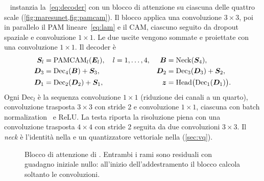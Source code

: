 \maresunet{}~\cite{li2022maresunet} instanzia la~\eqref{eq:decoder} con un blocco di attenzione
su ciascuna delle quattro scale (\cref{fig:maresunet,fig:pamcam}). Il blocco applica una
convoluzione $3\times3$, poi in parallelo il PAM lineare~\eqref{eq:lam} e il CAM, ciascuno
seguito da dropout spaziale e convoluzione $1\times1$. Le due uscite vengono sommate e
proiettate con una convoluzione $1\times1$. Il decoder è
\begin{align}
  \bm{S}_l &= \mathrm{PAMCAM}_l(\bm{E}_l),\quad l=1,\dots,4, &
  \bm{B} &= \mathrm{Neck}(\bm{S}_4), \nonumber\\
  \bm{D}_3 &= \mathrm{Dec}_4(\bm{B})+\bm{S}_3, &
  \bm{D}_2 &= \mathrm{Dec}_3(\bm{D}_3)+\bm{S}_2, \label{eq:maresunet}\\
  \bm{D}_1 &= \mathrm{Dec}_2(\bm{D}_2)+\bm{S}_1, &
  \bm{z} &= \mathrm{Head}\bigl(\mathrm{Dec}_1(\bm{D}_1)\bigr). \nonumber
\end{align}
Ogni $\mathrm{Dec}_l$ è la sequenza convoluzione $1\times1$ (riduzione dei canali a un quarto),
convoluzione trasposta $3\times3$ con stride 2 e convoluzione $1\times1$, ciascuna con batch
normalization~\cite{ioffe2015batchnorm} e ReLU. La testa riporta la risoluzione piena con una
convoluzione trasposta $4\times4$ con stride 2 seguita da due convoluzioni $3\times3$. Il
\emph{neck} è l'identità nella \maresunet{} e un quantizzatore vettoriale nella \maresunetvq{}
(\cref{sec:vq}).

\begin{figure}[p]
  \centering
  \resizebox{\linewidth}{!}{}
  \caption[Architettura MAResU-Net]{Architettura \maresunet{}. Le mappe dell'encoder a stride
    4--32 passano da un blocco di attenzione (PAM lineare e CAM in parallelo) prima di essere
    sommate alle uscite del decoder. Il neck sul collo di bottiglia è l'identità oppure un
    quantizzatore vettoriale. Le frecce rosse sono le connessioni di salto.}
  \label{fig:maresunet}
  \vspace{1.2em}
  \resizebox{\linewidth}{!}{}
  \caption[Blocco di attenzione PAM-CAM]{Blocco di attenzione di \maresunet{}. Entrambi i rami
    sono residuali con guadagno iniziale nullo: all'inizio dell'addestramento il blocco calcola
    soltanto le convoluzioni.}
  \label{fig:pamcam}
\end{figure}

